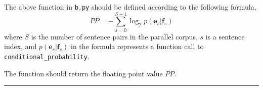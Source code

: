 \documentclass[]{article}
\begin{document}
The above function in \texttt{b.py} should be defined according to the following formula,
%
\begin{equation}
PP = - \sum_{s=0}^{S-1} \log_2 p({\bm e}_s | {\bm f}_s)
\end{equation}
%
where $S$ is the number of sentence pairs in the parallel corpus, $s$ is a sentence index, and $p({\bm e}_s | {\bm f}_s)$ in the formula represents a function call to \texttt{conditional\_probability}.

The function should return the floating point value $PP$.
\ \\
\noindent\rule[0.5ex]{\linewidth}{1pt}
\ \\
\end{document}
